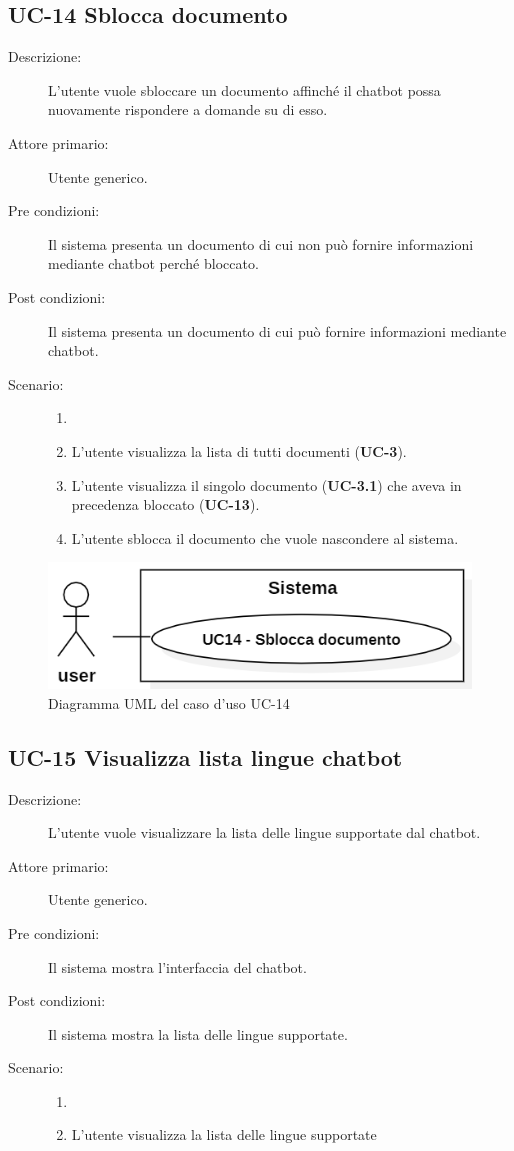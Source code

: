 \subsection{UC-14 Sblocca documento}
\begin{description}
    \item[Descrizione:] L'utente vuole sbloccare un documento affinché il chatbot possa nuovamente rispondere a domande su di esso.
    \item[Attore primario:] Utente generico.
    \item[Pre condizioni:] Il sistema presenta un documento di cui non può fornire informazioni mediante chatbot perché bloccato.
    \item[Post condizioni:] Il sistema presenta un documento di cui può fornire informazioni mediante chatbot.
    \item[Scenario:]
    \begin{enumerate}
        \item[]
        \item L’utente visualizza la lista di tutti documenti (\textbf{UC-3}).
        \item L'utente visualizza il singolo documento  (\textbf{UC-3.1}) che aveva in precedenza bloccato (\textbf{UC-13}).
        \item L'utente sblocca il documento che vuole nascondere al sistema.
    \end{enumerate}
\end{description}

\begin{figure}[H]
    \centering
    \includegraphics[width=0.8\linewidth]{UC14.PNG}
    \caption{Diagramma UML del caso d'uso UC-14}
\end{figure}

\subsection{UC-15 Visualizza lista lingue chatbot}
\begin{description}
    \item[Descrizione:] L'utente vuole visualizzare la lista delle lingue supportate dal chatbot.
    \item[Attore primario:] Utente generico.
    \item[Pre condizioni:] Il sistema mostra l'interfaccia del chatbot.
    \item[Post condizioni:] Il sistema mostra la lista delle lingue supportate.
    \item[Scenario:]
    \begin{enumerate}
        \item[]
        \item L'utente visualizza la lista delle lingue supportate
    \end{enumerate}
\end{description}

